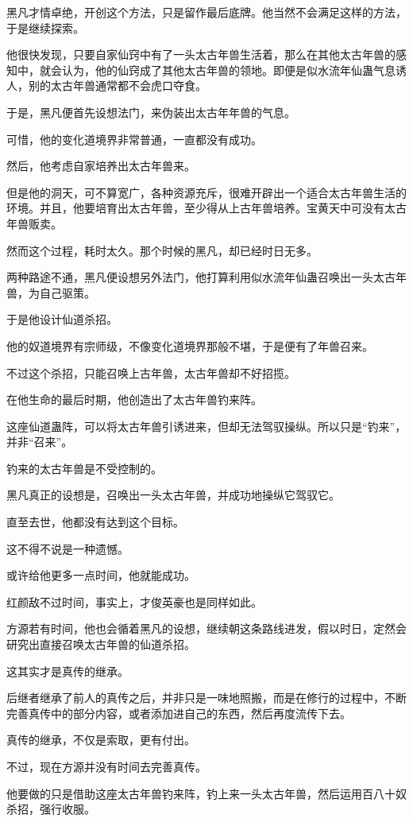 \begin{this_body}
黑凡才情卓绝，开创这个方法，只是留作最后底牌。他当然不会满足这样的方法，于是继续探索。

他很快发现，只要自家仙窍中有了一头太古年兽生活着，那么在其他太古年兽的感知中，就会认为，他的仙窍成了其他太古年兽的领地。即便是似水流年仙蛊气息诱人，别的太古年兽通常都不会虎口夺食。

于是，黑凡便首先设想法门，来伪装出太古年年兽的气息。

可惜，他的变化道境界非常普通，一直都没有成功。

然后，他考虑自家培养出太古年兽来。

但是他的洞天，可不算宽广，各种资源充斥，很难开辟出一个适合太古年兽生活的环境。并且，他要培育出太古年兽，至少得从上古年兽培养。宝黄天中可没有太古年兽贩卖。

然而这个过程，耗时太久。那个时候的黑凡，却已经时日无多。

两种路途不通，黑凡便设想另外法门，他打算利用似水流年仙蛊召唤出一头太古年兽，为自己驱策。

于是他设计仙道杀招。

他的奴道境界有宗师级，不像变化道境界那般不堪，于是便有了年兽召来。

不过这个杀招，只能召唤上古年兽，太古年兽却不好招揽。

在他生命的最后时期，他创造出了太古年兽钓来阵。

这座仙道蛊阵，可以将太古年兽引诱进来，但却无法驾驭操纵。所以只是“钓来”，并非“召来”。

钓来的太古年兽是不受控制的。

黑凡真正的设想是，召唤出一头太古年兽，并成功地操纵它驾驭它。

直至去世，他都没有达到这个目标。

这不得不说是一种遗憾。

或许给他更多一点时间，他就能成功。

红颜敌不过时间，事实上，才俊英豪也是同样如此。

方源若有时间，他也会循着黑凡的设想，继续朝这条路线进发，假以时日，定然会研究出直接召唤太古年兽的仙道杀招。

这其实才是真传的继承。

后继者继承了前人的真传之后，并非只是一味地照搬，而是在修行的过程中，不断完善真传中的部分内容，或者添加进自己的东西，然后再度流传下去。

真传的继承，不仅是索取，更有付出。

不过，现在方源并没有时间去完善真传。

他要做的只是借助这座太古年兽钓来阵，钓上来一头太古年兽，然后运用百八十奴杀招，强行收服。


\end{this_body}
